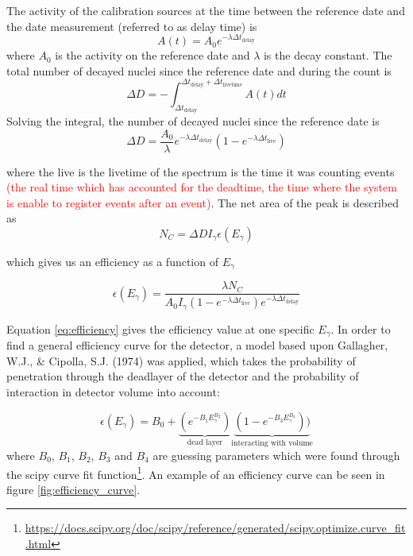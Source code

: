 \noindent 
The activity of the calibration sources at the time between the reference date and the date measurement (referred to as delay time) is 
\begin{equation}
    A(t) = A_0 e^{-\lambda \Delta t_\text{delay}}
\end{equation}
\noindent
where $A_0$ is the activity on the reference date and $\lambda$ is the decay constant. The total number of decayed nuclei since the reference date and during the count is 
\begin{equation}
\Delta D = -\int_{\Delta t_\text{delay}}^{\Delta t_\text{delay}+\Delta t_\text{livetime}} A(t)dt
\end{equation}
\noindent 
Solving the integral, the number of decayed nuclei since the reference date is 
\begin{equation}
    \Delta D = \frac{A_0}{\lambda}e^{-\lambda \Delta t_\text{delay}}(1-e^{-\lambda \Delta t_\text{live}})
\end{equation}

\noindent
where the live is the livetime of the spectrum is the time it was counting events \textcolor{red}{(the real time which has accounted for the deadtime, the time where the system is enable to register events after an event)}. 
The net area of the peak is described as 
\begin{equation}
    N_C = \Delta D I_\gamma \epsilon(E_\gamma)
\end{equation} 

\noindent 
which gives us an efficiency as a function of $E_\gamma$

\begin{equation} \label{eq:efficiency}
    \epsilon(E_\gamma)=\frac{\lambda N_C}{A_0 I_\gamma(1-e^{-\lambda \Delta t_\text{live}})e^{-\lambda \Delta t_\text{delay}}}
\end{equation}

\noindent
Equation \ref{eq:efficiency} gives the efficiency value at one specific $E_\gamma$. In order to find a general efficiency curve for the detector, a model based upon  Gallagher, W.J., & Cipolla, S.J. (1974) was applied, which takes the probability of penetration through the deadlayer of the detector and the probability of interaction in detector volume into account: 

\begin{equation} \label{eq:efficiency_estimated}
\epsilon(E_\gamma) =  B_0 + \underbrace{(e^{-B_1 E_\gamma^{B_2}})}_\text{dead layer}  \underbrace{(1-e^{-B_3 E_\gamma^{B_4}}))}_\text{interacting with volume} 
\end{equation}
\noindent
where $B_0$, $B_1$, $B_2$, $B_3$ and $B_4$ are guessing parameters which were found through the scipy curve fit function\footnote{\url{https://docs.scipy.org/doc/scipy/reference/generated/scipy.optimize.curve_fit.html}}. An example of an efficiency curve can be seen in figure \ref{fig:efficiency_curve}.  %


